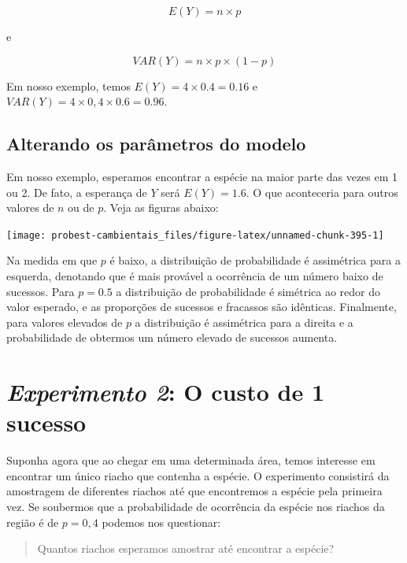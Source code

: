 \documentclass[
]{book}
\begin{document}
\[E(Y) = n \times p\]

e

\[VAR(Y) = n \times p \times (1-p)\]

Em nosso exemplo, temos \(E(Y) = 4 \times 0.4 = 0.16\) e \(VAR(Y) = 4 \times 0,4 \times 0.6 = 0.96\).

\hypertarget{alterando-os-paruxe2metros-do-modelo}{%
\subsection*{Alterando os parâmetros do modelo}\label{alterando-os-paruxe2metros-do-modelo}}

Em nosso exemplo, esperamos encontrar a espécie na maior parte das vezes em 1 ou 2. De fato, a esperança de \(Y\) será \(E(Y) = 1.6\). O que aconteceria para outros valores de \(n\) ou de \(p\). Veja as figuras abaixo:

\begin{center}\texttt{[image: probest-cambientais\_files/figure-latex/unnamed-chunk-395-1]} \end{center}

Na medida em que \(p\) é baixo, a distribuição de probabilidade é assimétrica para a esquerda, denotando que é mais provável a ocorrência de um número baixo de sucessos. Para \(p = 0.5\) a distribuição de probabilidade é simétrica ao redor do valor esperado, e as proporções de sucessos e fracassos são idênticas. Finalmente, para valores elevados de \(p\) a distribuição é assimétrica para a direita e a probabilidade de obtermos um número elevado de sucessos aumenta.

\hypertarget{experimento-2-o-custo-de-1-sucesso}{%
\section{\texorpdfstring{\emph{Experimento 2}: O custo de 1 sucesso}{Experimento 2: O custo de 1 sucesso}}\label{experimento-2-o-custo-de-1-sucesso}}

Suponha agora que ao chegar em uma determinada área, temos interesse em encontrar um único riacho que contenha a espécie. O experimento consistirá da amostragem de diferentes riachos até que encontremos a espécie pela primeira vez. Se soubermos que a probabilidade de ocorrência da espécie nos riachos da região é de \(p = 0,4\) podemos nos questionar:

\begin{quote}
Quantos riachos esperamos amostrar até encontrar a espécie?
\end{quote}
\end{document}
